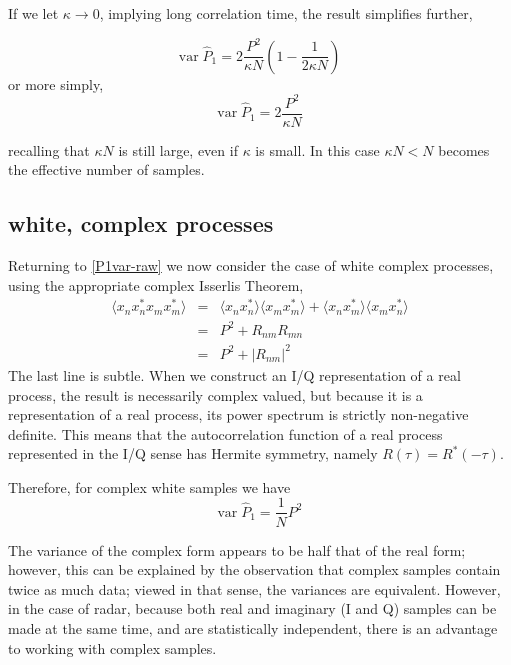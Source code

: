 If we let $\kappa \rightarrow 0$, implying long correlation time, the result simplifies further,

\begin{equation}
\textrm{var}\;\hat{P}_1 = 2\frac{P^2}{\kappa N} \left(1 - \frac{1}{2\kappa N}\right) 
\end{equation}
or more simply,
\begin{equation}
\textrm{var}\;\hat{P}_1 = 2\frac{P^2}{\kappa N} 
\end{equation}

recalling that $\kappa N$ is still large, even if $\kappa$ is small.  In this case $\kappa N < N$  becomes the effective number of samples.

\subsection{white, complex processes}

Returning to \eqref{P1var-raw} we now consider the case of white
complex processes, using the appropriate complex Isserlis Theorem,
\begin{eqnarray}
\langle x_n x_n^\ast x_m x_m^\ast \rangle &=& 
\langle x_n x_n^\ast \rangle\langle x_m x_m^\ast \rangle +
\langle x_n x_m^\ast \rangle \langle x_m x_n^\ast \rangle \\
&=& P^2 + R_{nm}R_{mn} \\
&=& P^2 + |R_{nm}|^2
\end{eqnarray}
The last line is subtle.  When we construct an I/Q representation of a real
process, the result is necessarily complex valued, but because it is a representation of
a real process, its power spectrum is strictly non-negative definite.  This means that the 
autocorrelation function of a real process represented in the I/Q sense has Hermite 
symmetry, namely $R(\tau) = R^\ast(-\tau)$. 

Therefore, for complex white samples we have
\begin{equation}
\textrm{var}\;\hat{P}_1 = \frac{1}{N} P^2
\end{equation}

The variance of the complex form appears to be half that of the real
form; however, this can be explained by the observation that complex
samples contain twice as much data; viewed in that sense, the
variances are equivalent.  However, in the case of radar, because both
real and imaginary (I and Q) samples can be made at the same time, and
are statistically independent, there is an advantage to
working with complex samples.

